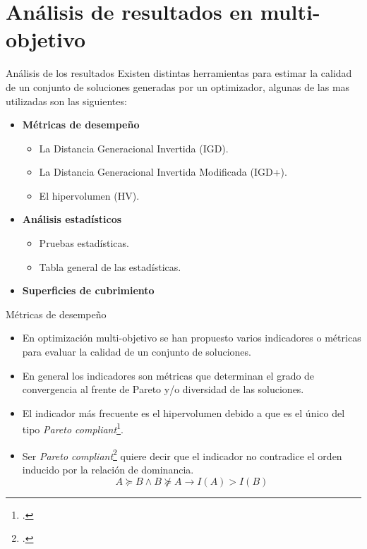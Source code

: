 \documentclass{beamer}
\begin{document}
\section{Análisis de resultados en multi-objetivo}

\begin{frame}{Análisis de los resultados}
Existen distintas herramientas para estimar la calidad de un conjunto de soluciones generadas por un optimizador, algunas de las mas utilizadas son las siguientes:
\begin{itemize}
\justifying
\item \textbf{Métricas de desempeño}
   \begin{itemize}
     \item La Distancia Generacional Invertida (IGD).
     \item La Distancia Generacional Invertida Modificada (IGD+).
     \item El hipervolumen (HV).
   \end{itemize}
\item \textbf{Análisis estadísticos}
  \begin{itemize}
      \item Pruebas estadísticas.
      \item Tabla general de las estadísticas.
  \end{itemize}
  \item \textbf{Superficies de cubrimiento}
\end{itemize}
\end{frame}

\begin{frame}{Métricas de desempeño}
   \begin{itemize}
	\scriptsize
        \item En optimización multi-objetivo se han propuesto varios indicadores o métricas para evaluar la calidad de un conjunto de soluciones.
	\item En general los indicadores son métricas que determinan el grado de convergencia al frente de Pareto y/o diversidad de las soluciones.
	\item El indicador más frecuente es el hipervolumen debido a que es el único del tipo \textit{Pareto compliant}\footcite
{Joel:ComparativeCaseStudy}.
	\item Ser \textit{Pareto compliant}\footcite{Joel:ComparacionMetricas} quiere decir que el indicador no contradice el orden inducido por la relación de dominancia.
	\begin{equation*}
	   A \succeq B \wedge  B \not \succeq A \rightarrow I(A) > I(B)
	\end{equation*}
   \end{itemize} 
\end{frame}
\end{document}
